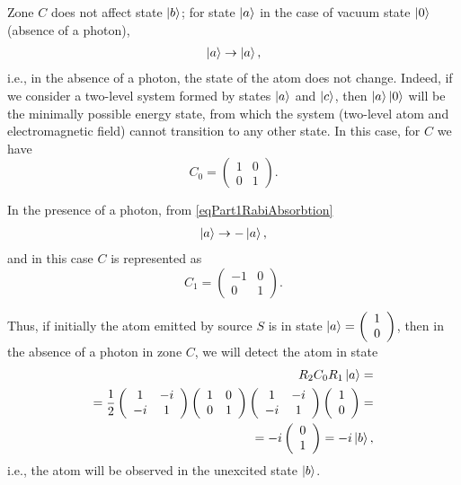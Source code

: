 Zone $C$ does not affect state $\ket{b}$; for state $\ket{a}$ in the case of vacuum state $\ket{0}$ (absence of a photon),
\begin{eqnarray}
  \ket{a} \rightarrow \ket{a},
  \nonumber
\end{eqnarray}
i.e., in the absence of a photon, the state of the atom does not change. Indeed, if we consider a two-level system formed by states $\ket{a}$ and $\ket{c}$, then $\ket{a}\ket{0}$ will be the minimally possible energy state, from which the system (two-level atom and electromagnetic field) cannot transition to any other state.
In this case, for $C$ we have
\[
C_0 = \left(
\begin{array} {cc}
1 & 0
\\
0 & 1 
\end{array}
\right).
\]

In the presence of a photon, from \eqref{eqPart1RabiAbsorbtion}
\begin{eqnarray}
  \ket{a} \rightarrow -\ket{a},
  \nonumber
\end{eqnarray}
and in this case $C$ is represented as
\[
C_1 = \left(
\begin{array} {cc}
-1 & 0
\\
0 & 1 
\end{array}
\right).
\]

Thus, if initially the atom emitted by source $S$ is in state $\ket{a} = \left(
\begin{array} {c}
1
\\
0
\end{array}
\right)$, then in the absence of a photon in zone $C$, we will detect the atom in state
\begin{eqnarray}
  R_2 C_0 R_1 \ket{a} =
  \nonumber \\
  =
  \frac{1}{2}
  \left(
  \begin{array} {cc}
    1 & -i
    \\
    -i & 1 
  \end{array}
  \right)
  \left(
  \begin{array} {cc}
    1 & 0
    \\
    0 & 1 
  \end{array}
  \right)
  \left(
  \begin{array} {cc}
    1 & -i
    \\
    -i & 1 
  \end{array}
  \right)
  \left(
  \begin{array} {c}
    1
    \\
    0
  \end{array}
  \right) =
  \nonumber \\
  =
  -i 
  \left(
  \begin{array} {c}
    0
    \\
    1
  \end{array}
  \right) =
  -i \ket{b},
  \nonumber
\end{eqnarray}
i.e., the atom will be observed in the unexcited state $\ket{b}$.

